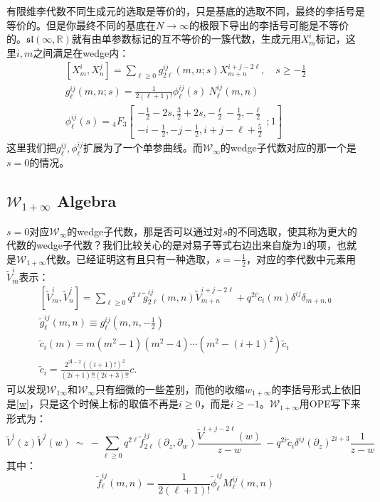 有限维李代数不同生成元的选取是等价的，只是基底的选取不同，最终的李括号是等价的。但是你最终不同的基底在$N\to\infty$的极限下导出的李括号可能是不等价的。$\mathfrak{sl}(\infty,\mathbb{R})$就有由单参数标记的互不等价的一簇代数，生成元用$X^i_m$标记，这里$i,m$之间满足在wedge内：
\begin{equation}
	\begin{gathered}
		[X_m^i,X_n^j]=\sum_{\ell\geq0}g_{2\ell}^{ij}(m,n;s)X_{m+n}^{i+j-2\ell},\quad s\geq -\frac12\\
		g_{\ell}^{ij}(m,n;s)=\frac1{2(\ell+1)!}\phi_{\ell}^{ij}(s)~N_{\ell}^{ij}(m,n)\\
		\left.\phi_\ell^{ij}(s)={}_4F_3\left[\begin{array}{c}-\frac{1}{2}-2s,\frac{3}{2}+2s,-\frac{\ell}{2}-\frac{1}{2},-\frac{\ell}{2}\\-i-\frac{1}{2},-j-\frac{1}{2},i+j-\ell+\frac{5}{2}\end{array}\right.;1\right]
	\end{gathered}
\end{equation}
这里我们把$g^{ij}_\ell,\phi^{ij}_\ell$扩展为了一个单参曲线。而$\mathcal{W}_\infty$的wedge子代数对应的那一个是$s=0$的情况。
\subsection{$\mathcal{W}_{1+\infty}$ Algebra}
$s=0$对应$\mathcal{W}_\infty$的wedge子代数，那是否可以通过对$s$的不同选取，使其称为更大的代数的wedge子代数？我们比较关心的是对易子等式右边出来自旋为$1$的项，也就是$\mathcal{W}_{1+\infty}$代数。已经证明这有且只有一种选取，$s=-\frac{1}{2}$，对应的李代数中元素用$\tilde{V}^{i}_m$表示：
\begin{equation}
	\begin{gathered}
		[\widetilde{V}_m^i,\widetilde{V}_n^j]=\sum_{\ell\geq0}q^{2\ell}\tilde{g}_{2\ell}^{ij}(m,n)\widetilde{V}_{m+n}^{i+j-2\ell}+q^{2i}\tilde{c}_i(m)\delta^{ij}\delta_{m+n,0}\\
		\tilde{g}_{\ell}^{ij}(m,n)\equiv g_{\ell}^{ij}(m,n,-\frac12)\\
		\tilde{c}_i(m)=m(m^2-1)(m^2-4)\cdots(m^2-(i+1)^2)\tilde{c}_i\\
		\widetilde{c}_i=\frac{2^{2\boldsymbol{i}-2}\left((i+1)!\right)^2}{(2i+1)!!(2i+3)!!}c.
	\end{gathered}
\end{equation}
可以发现$\mathcal{W}_{1\infty}$和$\mathcal{W}_\infty$只有细微的一些差别，而他的收缩$w_{1+\infty}$的李括号形式上依旧是\ref{w}，只是这个时候上标的取值不再是$i\geq 0$，而是$i\geq -1$。$\mathcal{W}_{1+\infty}$用OPE写下来形式为：
\begin{equation}
	\widetilde{V}^i(z)\widetilde{V}^j(w)~\sim~-\sum_{\ell\geq0}q^{2\ell}\widetilde{f}_{2\ell}^{ij}(\partial_z,\partial_w)\frac{\widetilde{V}^{i+j-2\ell}(w)}{z-w}~-q^{2i}\widetilde{c}_i\delta^{ij}(\partial_z)^{2i+3}\frac{1}{z-w}
\end{equation}
其中：
\begin{equation}
	\tilde{f}_{\ell}^{ij}(m,n)=\frac1{2(\ell+1)!}\tilde{\phi}_{\ell}^{ij}M_{\ell}^{ij}(m,n)
\end{equation}
